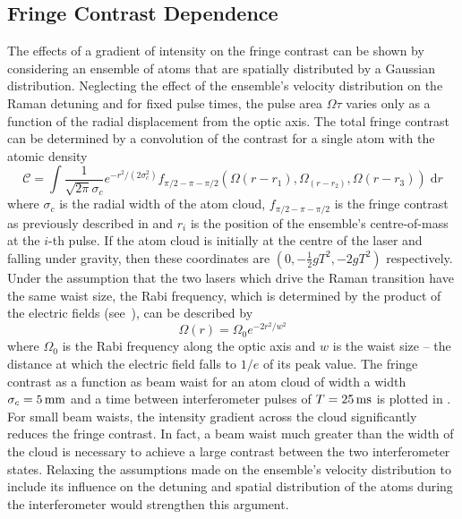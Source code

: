 \subsection{Fringe Contrast Dependence}
The effects of a gradient of intensity on the fringe contrast can be shown by considering an ensemble of atoms that are spatially distributed by a Gaussian distribution. Neglecting the effect of the ensemble's velocity distribution on the Raman detuning and for fixed pulse times, the pulse area \(\Omega \tau\) varies only as a function of the radial displacement from the optic axis. The total fringe contrast can be determined by a convolution of the contrast for a single atom with the atomic density
\begin{equation}
    \mathcal{C} = \int \frac{1}{\sqrt{2\pi}\sigma_c}e^{-r^2/(2\sigma_c^2)} f_{\pi/2-\pi-\pi/2}\left(\Omega(r-r_1),\Omega_(r-r_2),\Omega(r-r_3)\right) \;\mathrm{d}r
    \label{eq:cloud_contrast}
\end{equation}
where \(\sigma_c\) is the radial width of the atom cloud, \(f_{\pi/2-\pi-\pi/2}\) is the fringe contrast as previously described in  and \(r_i\) is the position of the ensemble's centre-of-mass at the \(i\)-th pulse. If the atom cloud is initially at the centre of the laser and falling under gravity, then these coordinates are \(\left(0, -\frac{1}{2}g T^2, -2 g T^2\right)\) respectively. Under the assumption that the two lasers which drive the Raman transition have the same waist size, the Rabi frequency, which is determined by the product of the electric fields (see~), can be described by 
\begin{equation}
    \Omega(r) = \Omega_0 e^{-2 r^2/w^2}
\end{equation}
where \(\Omega_0\) is the Rabi frequency along the optic axis and \(w\) is the waist size -- the distance at which the electric field falls to \(1/e\) of its peak value. The fringe contrast as a function as beam waist for an atom cloud of width a width \(\sigma_c = \sivalue{5}{\milli\metre}\) and a time between interferometer pulses of \(T = \sivalue{25}{\milli\second}\) is plotted in . For small beam waists, the intensity gradient across the cloud significantly reduces the fringe contrast. In fact, a beam waist much greater than the width of the cloud is necessary to achieve a large contrast between the two interferometer states. Relaxing the assumptions made on the ensemble's velocity distribution to include its influence on the detuning and spatial distribution of the atoms during the interferometer would strengthen this argument.
